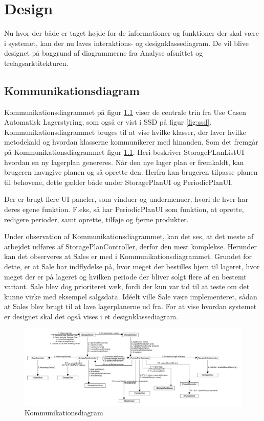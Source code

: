 \chapter{Design}\label{ch:design}
Nu hvor der både er taget højde for de informationer og funktioner der skal være i systemet, kan der nu laves interaktions- og designklassediagram. De vil blive designet på baggrund af diagrammerne fra Analyse afsnittet og trelagsarktitekturen. 

\section{Kommunikationsdiagram}
Kommunikationsdiagrammet\cite{Larman2004} på figur \ref{fig:Kommunikationsdiagram} viser de centrale trin fra Use Casen Automatisk Lagerstyring, som også er vist i SSD på figur \ref{fig:ssd}. Kommunikationsdiagrammet bruges til at vise hvilke klasser, der laver hvilke metodekald og hvordan klasserne kommunikerer med hinanden. 
Som det fremgår på Kommunikationsdiagrammet figur \ref{fig:Kommunikationsdiagram}. Heri beskriver StoragePLanListUI hvordan en ny lagerplan genereres. Når den nye lager plan er fremkaldt, kan brugeren navngive planen og så oprette den. Herfra kan brugeren tilpasse planen til behovene, dette gælder både under StoragePlanUI og PeriodicPlanUI. 

Der er brugt flere UI paneler, som vinduer og undermenuer, hvori de hver har deres egene funktion. 
F.eks, så har PeriodicPlanUI som funktion, at oprette, redigere perioder, samt oprette, tilføje og fjerne produkter. 

Under observation af Kommunikationsdiagrammet, kan det ses, at det meste af arbejdet udføres af StoragePlanController, derfor den mest komplekse. Herunder kan det observeres at Sales er med i Kommunikationsdiagrammet. Grundet for dette, er at Sale har indflydelse på, hvor meget der bestilles hjem til lageret, hvor meget der er på lageret og hvilken periode der bliver solgt flere af en bestemt variant. 
Sale blev dog prioriteret væk, fordi der kun var tid til at teste om det kunne virke med eksempel salgsdata.
Idéelt ville Sale være implementeret, sådan at Sales blev brugt til at lave lagerplanerne ud fra. For at vise hvordan systemet er designet skal det også vises i et designklassediagram.

\begin{landscape}
    \begin{figure}[p]
        \centering
        \includegraphics[width=0.8\hsize]{figures/design/Kommunikationsdiagram}
        \caption{Kommunikationsdiagram}
        \label{fig:Kommunikationsdiagram}
    \end{figure}
\end{landscape}

